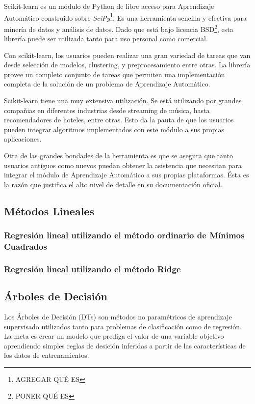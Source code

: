 Scikit-learn es un módulo de Python de libre acceso para Aprendizaje Automático
construido sobre \textit{SciPy}\footnote{AGREGAR QUÉ ES}. Es una herramienta
sencilla y efectiva para minería de datos y análisis de datos. Dado que está bajo
licencia BSD\footnote{PONER QUÉ ES}, esta librería puede ser utilizada tanto
para uso personal como comercial.

Con scikit-learn, los usuarios pueden realizar una gran variedad de tareas
que van desde selección de modelos, clustering, y preprocesamiento entre otras.
La librería provee un completo conjunto de tareas que permiten una
implementación completa de la solución de un problema
de Aprendizaje Automático.

Scikit-learn tiene una muy extensiva utilización. Se está utilizando por
grandes compañias en diferentes industrias desde streaming de música, hasta
recomendadores de hoteles, entre otras. Esto da la pauta de que los usuarios pueden
integrar algoritmos implementados con este módulo a sus propias aplicaciones.

Otra de las grandes bondades de la herramienta es que se asegura que tanto usuarios
antiguos como nuevos puedan obtener la asistencia que necesitan para integrar
el módulo de Aprendizaje Automático a sus propias plataformas. Ésta es la razón
que justifica el alto nivel de detalle en su documentación oficial.



\subsection{Métodos Lineales}

\subsubsection{Regresión lineal utilizando el método ordinario de Mínimos Cuadrados}

\subsubsection{Regresión lineal utilizando el método Ridge}


\subsection{Árboles de Decisión}
Los Árboles de Decisión (DTs) son métodos no paramétricos de aprendizaje supervisado
utilizados tanto para problemas de clasificación como de regresión.
La meta es crear un modelo que prediga el valor de una variable objetivo aprendiendo
simples reglas de desición inferidas a partir de las características de los datos
de entrenamientos.

